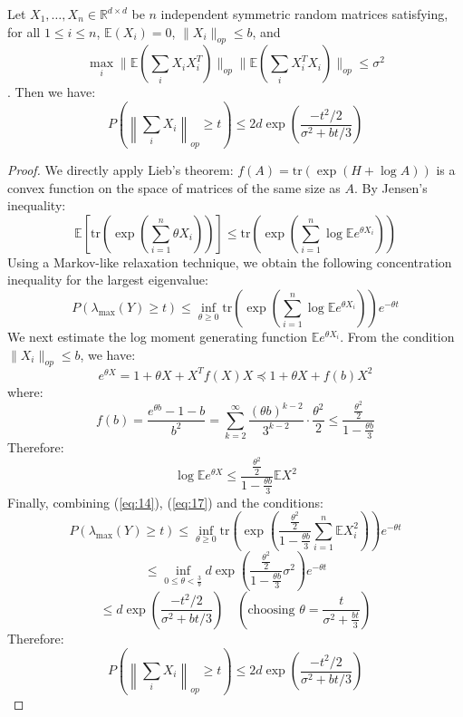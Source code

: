 \begin{thm}
Let $X_1, \ldots, X_n \in \mathbb{R}^{d \times d}$ be $n$ independent symmetric random matrices satisfying, for all $1 \leq i \leq n$, $\mathbb{E}(X_i) = 0$, $\|X_i\|_{op} \leq b$, and 
\[
\max_i \|\mathbb{E}(\sum_i X_i X_i^T)\|_{op} \|\mathbb{E}(\sum_i X_i^T X_i)\|_{op} \leq \sigma^2
\]. Then we have:
\[
P\left(\left\|\sum_i X_i\right\|_{op} \geq t\right) \leq 2d \exp\left(\frac{-t^2/2}{\sigma^2 + bt/3}\right)
\]
\end{thm}

\begin{proof}
We directly apply Lieb's theorem: $f(A) = \mathrm{tr}(\exp(H + \log A))$ is a convex function on the space of matrices of the same size as $A$. By Jensen's inequality:
\[
\mathbb{E}\left[\mathrm{tr}\left(\exp\left(\sum_{i=1}^n \theta X_i\right)\right)\right] \leq \mathrm{tr}\left(\exp\left(\sum_{i=1}^n \log \mathbb{E} e^{\theta X_i}\right)\right)
\]
Using a Markov-like relaxation technique, we obtain the following concentration inequality for the largest eigenvalue:
\begin{equation}
\label{eq:14}
P(\lambda_{\max}(Y) \geq t) \leq \inf_{\theta \geq 0} \mathrm{tr}\left(\exp\left(\sum_{i=1}^n \log \mathbb{E} e^{\theta X_i}\right)\right) e^{-\theta t}
\end{equation}
We next estimate the log moment generating function $\mathbb{E} e^{\theta X_i}$. From the condition $\|X_i\|_{op} \leq b$, we have:
\[
e^{\theta X} = 1 + \theta X + X^T f(X) X \preceq 1 + \theta X + f(b) X^2
\]
where:
\[
f(b) = \frac{e^{\theta b} - 1 - b}{b^2} = \sum_{k=2}^{\infty} \frac{(\theta b)^{k-2}}{3^{k-2}} \cdot \frac{\theta^2}{2} \leq \frac{\frac{\theta^2}{2}}{1 - \frac{\theta b}{3}}
\]
Therefore:
\begin{equation}
\label{eq:17}
    \log \mathbb{E} e^{\theta X} \leq \frac{\frac{\theta^2}{2}}{1 - \frac{\theta b}{3}} \mathbb{E} X^2
\end{equation}
Finally, combining (\ref{eq:14}), (\ref{eq:17}) and the conditions:
\[
P(\lambda_{\max}(Y) \geq t) \leq \inf_{\theta \geq 0} \mathrm{tr}\left(\exp\left(\frac{\frac{\theta^2}{2}}{1 - \frac{\theta b}{3}} \sum_{i=1}^n \mathbb{E} X_i^2\right)\right) e^{-\theta t}
\]
\[
\leq \inf_{0 \leq \theta < \frac{3}{b}} d \exp\left(\frac{\frac{\theta^2}{2}}{1 - \frac{\theta b}{3}} \sigma^2\right) e^{-\theta t}
\]
\[
\leq d \exp\left(\frac{-t^2/2}{\sigma^2 + bt/3}\right) \quad \left(\text{choosing } \theta = \frac{t}{\sigma^2 + \frac{bt}{3}}\right)
\]
Therefore:
\[
P\left(\left\|\sum_i X_i\right\|_{op} \geq t\right) \leq 2d \exp\left(\frac{-t^2/2}{\sigma^2 + bt/3}\right)
\]
\end{proof}





